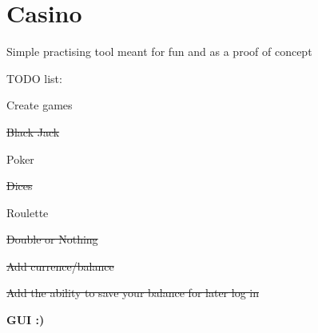 \chapter{Casino}
\label{md__r_e_a_d_m_e}
\label{md__r_e_a_d_m_e_autotoc_md0}%
Simple practising tool meant for fun and as a proof of concept

TODO list\+:
\begin{DoxyItemize}
\item Create games
\begin{DoxyItemize}
\item \sout{Black Jack}
\item Poker
\item \sout{Dices}
\item Roulette
\item \sout{Double or Nothing}
\end{DoxyItemize}
\item \sout{Add currence/balance}
\item \sout{Add the ability to save your balance for later log in}
\item {\bfseries{GUI \+:)}} 
\end{DoxyItemize}